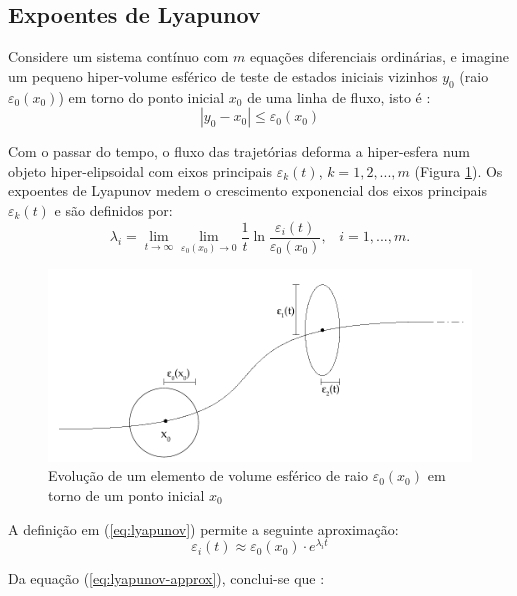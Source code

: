 \documentclass[a4paper, 12pt]{article}
\begin{document}
\subsection{Expoentes de Lyapunov}
Considere um sistema contínuo com $m$ equações diferenciais ordinárias, e imagine um pequeno hiper-volume esférico de teste de estados iniciais vizinhos $y_0$ (raio $\varepsilon_0 (x_0)$) em torno do ponto inicial $x_0$ de uma linha de fluxo, isto é \cite{fiedler1994caos}:
\begin{equation}
	|y_0 - x_0| \leq \varepsilon_0 (x_0)
\end{equation}

Com o passar do tempo, o fluxo das trajetórias deforma a hiper-esfera num objeto hiper-elipsoidal com eixos principais $\varepsilon_k (t)$, $k = 1, 2, ..., m$ (Figura \ref{fig:lyapunov}). Os expoentes de Lyapunov medem o crescimento exponencial dos eixos principais $\varepsilon_k (t)$ e são definidos por:
\begin{equation}\label{eq:lyapunov}
\lambda_i = \lim_{t \rightarrow \infty} \lim_{\varepsilon_0 (x_0) \rightarrow 0} \frac{1}{t} \ln \frac{\varepsilon_i (t)}{\varepsilon_0 (x_0)}, \; \; \; i = 1, ..., m.
\end{equation}
\begin{figure}[!ht]
\centering
\includegraphics[scale = 0.7]{lyapunov.pdf}
\caption{Evolução de um elemento de volume esférico de raio $\varepsilon_0 (x_0)$ em torno de um ponto inicial $x_0$}
\label{fig:lyapunov}
\end{figure}

A definição em (\ref{eq:lyapunov}) permite a seguinte aproximação:
\begin{equation}\label{eq:lyapunov-approx}
	\varepsilon_i (t) \approx \varepsilon_0 (x_0) \cdot e^{\lambda_i t}
\end{equation}

Da equação (\ref{eq:lyapunov-approx}), conclui-se que \cite{fiedler1994caos}:
\end{document}
